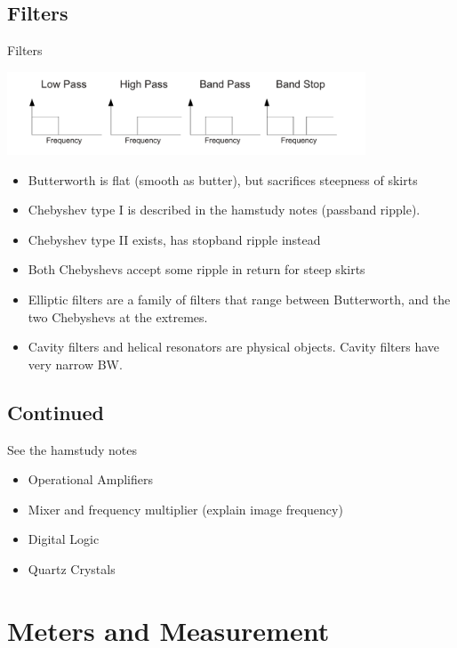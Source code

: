 \documentclass{beamer}
\begin{document}
\subsection{Filters}
\begin{frame}{Filters}{}

\includegraphics[width=0.8\textwidth]{images/filters.pdf}
\begin{itemize}
\item Butterworth is flat (smooth as butter), but sacrifices steepness of skirts
\item Chebyshev type I is described in the hamstudy notes (passband ripple).
\item Chebyshev type II exists, has stopband ripple instead
\item Both Chebyshevs accept some ripple in return for steep skirts
\item Elliptic filters are a family of filters that range between Butterworth, and the two Chebyshevs at the extremes.
\item Cavity filters and helical resonators are physical objects.  Cavity filters have very narrow BW.
\end{itemize}
\end{frame}


\subsection{Continued}
\begin{frame}{See the hamstudy notes}{}

\begin{itemize}
\item Operational Amplifiers
\item Mixer and frequency multiplier (explain image frequency)
\item Digital Logic
\item Quartz Crystals
\end{itemize}
\end{frame}



\section{Meters and Measurement}
\end{document}
